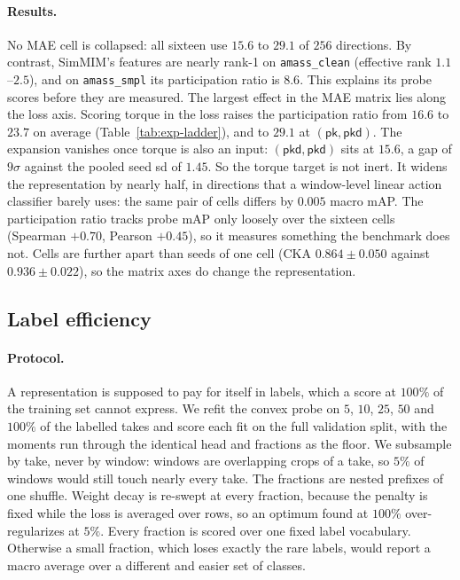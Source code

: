 \paragraph{Results.} No MAE cell is collapsed: all sixteen use $15.6$ to $29.1$ of $256$
directions. By contrast, SimMIM's features are nearly rank-1 on \texttt{amass\_clean}
(effective rank $1.1$--$2.5$), and on \texttt{amass\_smpl} its participation ratio is
$8.6$. This explains its probe scores before they are measured. The largest effect in the
MAE matrix lies along the loss axis. Scoring torque in the loss raises the participation
ratio from $16.6$ to $23.7$ on average (Table~\ref{tab:exp-ladder}), and to $29.1$ at
$(\textsf{pk},\textsf{pkd})$. The expansion vanishes once torque is also an input:
$(\textsf{pkd},\textsf{pkd})$ sits at $15.6$, a gap of $9\sigma$ against the pooled seed sd
of $1.45$. So the torque target is not inert. It widens the representation by nearly half,
in directions that a window-level linear action classifier barely uses: the same pair of
cells differs by $0.005$ macro mAP. The participation ratio tracks probe mAP only loosely
over the sixteen cells (Spearman $+0.70$, Pearson $+0.45$), so it measures something the
benchmark does not. Cells are further apart than seeds of one cell (CKA
$0.864\pm0.050$ against $0.936\pm0.022$), so the matrix axes do change the representation.

\subsection{Label efficiency}
\label{sec:exp-label-efficiency}

\paragraph{Protocol.} A representation is supposed to pay for itself in labels, which a
score at $100\%$ of the training set cannot express. We refit the convex probe on $5$, $10$,
$25$, $50$ and $100\%$ of the labelled takes and score each fit on the full validation
split, with the moments run through the identical head and fractions as the floor. We
subsample by take, never by window: windows are overlapping crops of a take, so $5\%$ of
windows would still touch nearly every take. The fractions are nested prefixes of one
shuffle. Weight decay is re-swept at every fraction, because the penalty is fixed while the
loss is averaged over rows, so an optimum found at $100\%$ over-regularizes at $5\%$. Every
fraction is scored over one fixed label vocabulary. Otherwise a small fraction, which loses
exactly the rare labels, would report a macro average over a different and easier set of
classes.

